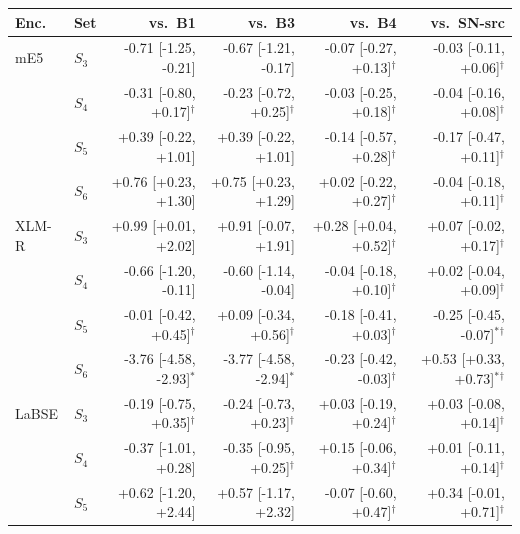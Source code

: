 \begin{tabular}{@{}llrrrr@{}}\toprule
Enc. & Set & vs.\ B1 & vs.\ B3 & vs.\ B4 & vs.\ SN-src\\\midrule
mE5 & $S_3$ & -0.71 \scriptsize[-1.25, -0.21] & -0.67 \scriptsize[-1.21, -0.17] & -0.07 \scriptsize[-0.27, +0.13]$^{\dagger}$ & -0.03 \scriptsize[-0.11, +0.06]$^{\dagger}$\\
 & $S_4$ & -0.31 \scriptsize[-0.80, +0.17]$^{\dagger}$ & -0.23 \scriptsize[-0.72, +0.25]$^{\dagger}$ & -0.03 \scriptsize[-0.25, +0.18]$^{\dagger}$ & -0.04 \scriptsize[-0.16, +0.08]$^{\dagger}$\\
 & $S_5$ & +0.39 \scriptsize[-0.22, +1.01] & +0.39 \scriptsize[-0.22, +1.01] & -0.14 \scriptsize[-0.57, +0.28]$^{\dagger}$ & -0.17 \scriptsize[-0.47, +0.11]$^{\dagger}$\\
 & $S_6$ & +0.76 \scriptsize[+0.23, +1.30] & +0.75 \scriptsize[+0.23, +1.29] & +0.02 \scriptsize[-0.22, +0.27]$^{\dagger}$ & -0.04 \scriptsize[-0.18, +0.11]$^{\dagger}$\\
\midrule
XLM-R & $S_3$ & +0.99 \scriptsize[+0.01, +2.02] & +0.91 \scriptsize[-0.07, +1.91] & +0.28 \scriptsize[+0.04, +0.52]$^{\dagger}$ & +0.07 \scriptsize[-0.02, +0.17]$^{\dagger}$\\
 & $S_4$ & -0.66 \scriptsize[-1.20, -0.11] & -0.60 \scriptsize[-1.14, -0.04] & -0.04 \scriptsize[-0.18, +0.10]$^{\dagger}$ & +0.02 \scriptsize[-0.04, +0.09]$^{\dagger}$\\
 & $S_5$ & -0.01 \scriptsize[-0.42, +0.45]$^{\dagger}$ & +0.09 \scriptsize[-0.34, +0.56]$^{\dagger}$ & -0.18 \scriptsize[-0.41, +0.03]$^{\dagger}$ & -0.25 \scriptsize[-0.45, -0.07]$^{*}$$^{\dagger}$\\
 & $S_6$ & -3.76 \scriptsize[-4.58, -2.93]$^{*}$ & -3.77 \scriptsize[-4.58, -2.94]$^{*}$ & -0.23 \scriptsize[-0.42, -0.03]$^{\dagger}$ & +0.53 \scriptsize[+0.33, +0.73]$^{*}$$^{\dagger}$\\
\midrule
LaBSE & $S_3$ & -0.19 \scriptsize[-0.75, +0.35]$^{\dagger}$ & -0.24 \scriptsize[-0.73, +0.23]$^{\dagger}$ & +0.03 \scriptsize[-0.19, +0.24]$^{\dagger}$ & +0.03 \scriptsize[-0.08, +0.14]$^{\dagger}$\\
 & $S_4$ & -0.37 \scriptsize[-1.01, +0.28] & -0.35 \scriptsize[-0.95, +0.25]$^{\dagger}$ & +0.15 \scriptsize[-0.06, +0.34]$^{\dagger}$ & +0.01 \scriptsize[-0.11, +0.14]$^{\dagger}$\\
 & $S_5$ & +0.62 \scriptsize[-1.20, +2.44] & +0.57 \scriptsize[-1.17, +2.32] & -0.07 \scriptsize[-0.60, +0.47]$^{\dagger}$ & +0.34 \scriptsize[-0.01, +0.71]$^{\dagger}$\\

\end{tabular}
